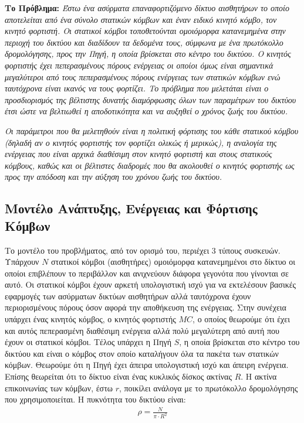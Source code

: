 \textbf{Το Πρόβλημα:} \textit{Έστω ένα ασύρματα επαναφορτιζόμενο δίκτυο αισθητήρων το οποίο αποτελείται από ένα σύνολο στατικών κόμβων και έναν ειδικό κινητό κόμβο,
τον κινητό φορτιστή. Οι στατικοί κόμβοι τοποθετούνται ομοιόμορφα κατανεμημένα στην περιοχή του δικτύου και διαδίδουν τα δεδομένα τους, σύμφωνα με ένα πρωτόκολλο
δρομολόγησης, προς την Πηγή, η οποία βρίσκεται στο κέντρο του δικτύου. Ο κινητός φορτιστής έχει πεπερασμένους πόρους ενέργειας οι οποίοι όμως είναι σημαντικά
μεγαλύτεροι από τους πεπερασμένους πόρους ενέργειας των στατικών κόμβων ενώ ταυτόχρονα είναι ικανός να τους φορτίζει. Το πρόβλημα που μελετάται είναι ο
προσδιορισμός της βέλτιστης δυνατής διαμόρφωσης όλων των παραμέτρων του δικτύου έτσι ώστε να βελτιωθεί η αποδοτικότητα και να αυξηθεί ο χρόνος ζωής του δικτύου.}

\textit{Οι παράμετροι που θα μελετηθούν είναι η πολιτική φόρτισης του κάθε στατικού κόμβου (δηλαδή αν ο κινητός φορτιστής τον φορτίζει ολικώς ή μερικώς), η αναλογία
της ενέργειας που είναι αρχικά διαθέσιμη στον κινητό φορτιστή και στους στατικούς κόμβους, καθώς και οι βέλτιστες διαδρομές που θα ακολουθεί ο κινητός φορτιστής ως
προς την απόδοση και την αύξηση του χρόνου ζωής του δικτύου.}



\subsection{Μοντέλο Ανάπτυξης, Ενέργειας και Φόρτισης Κόμβων}
Το μοντέλο του προβλήματος, από τον ορισμό του, περιέχει 3 τύπους συσκευών. Υπάρχουν $N$ στατικοί κόμβοι (αισθητήρες) ομοιόμορφα κατανεμημένοι στο δίκτυο οι
οποίοι επιβλέπουν το περιβάλλον και ανιχνεύουν διάφορα γεγονότα που γίνονται σε αυτό. Οι στατικοί κόμβοι έχουν αρκετή υπολογιστική ισχύ για να εκτελέσουν βασικές
εφαρμογές των ασύρματων δικτύων αισθητήρων αλλά ταυτόχρονα έχουν περιορισμένους πόρους όσον αφορά την αποθήκευση της ενέργειας. Στην συνέχεια υπάρχει ένας κινητός
κόμβος, ο κινητός φορτιστής $MC$, ο οποίος θεωρούμε ότι έχει και αυτός πεπερασμένη διαθέσιμη ενέργεια αλλά πολύ μεγαλύτερη από αυτή που έχουν οι στατικοί κόμβοι.
Τέλος υπάρχει η Πηγή $S$, η οποία βρίσκεται στο κέντρο του δικτύου και είναι ο κόμβος στον οποίο καταλήγουν όλα τα πακέτα των στατικών κόμβων. Θεωρούμε ότι η Πηγή
έχει άπειρα υπολογιστική ισχύ και άπειρη ενέργεια. Επίσης θεωρείται ότι το δίκτυο είναι ένας κυκλικός δίσκος ακτίνας $R$. Η ακτίνα επικοινωνίας των κόμβων, έστω $r$,
ποικίλει ανάλογα με το πρωτόκολλο δρομολόγησης που χρησιμοποιείται. Η πυκνότητα του δικτύου είναι:
\begin{align*}
\rho = \frac{N}{\pi\cdot R^{2}}
\end{align*}

